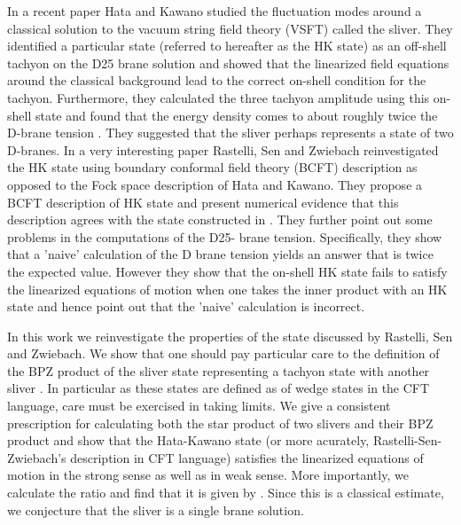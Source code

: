 \documentclass[a4paper,12pt]{article}
\begin{document}
In a recent paper \cite{hk} Hata and Kawano studied the fluctuation modes
around a classical solution to the vacuum string field theory (VSFT) called the
sliver. They identified a particular state (referred to hereafter as the HK
state) as an off-shell tachyon on the D25 brane solution and showed that
the linearized field equations around the classical background lead to the
correct on-shell condition for the tachyon. Furthermore, they calculated
the three tachyon amplitude using this on-shell state and found that the
energy density \coordHE{} comes to about roughly twice the D-brane
tension \coordHE{} \cite{hk}. They suggested that the sliver
perhaps
represents a state of two D-branes. In a very interesting paper \cite{rsz1}
Rastelli, Sen and Zwiebach reinvestigated the HK state using boundary
conformal field theory (BCFT) description as opposed to the Fock space
 description of Hata and Kawano. They propose a BCFT description of HK state
and present numerical evidence that this description agrees with the state
constructed in \cite{hk}. They further point out some problems in
the computations of the D25- brane tension. Specifically, they show that a
'naive' calculation of the D brane tension yields an answer that is twice
the expected value. However they show that the on-shell HK state fails to
satisfy the linearized equations of motion when one takes the inner product
with an HK state and hence point out that the 'naive' calculation is
incorrect.

In this work we reinvestigate the properties of the state discussed by
Rastelli, Sen
and Zwiebach. We show that one should pay particular care to the definition
of the BPZ product of the sliver state \coordHE{} representing
a tachyon state with another sliver \coordHE{}. In particular
as these states are defined as \coordHE{} of wedge states in the CFT
language, care must be  exercised
in taking \coordHE{} limits. We give a
consistent prescription for calculating both the star product of two slivers
and their BPZ product and show that the Hata-Kawano state (or more acurately,
Rastelli-Sen-Zwiebach's description in CFT language) satisfies the
linearized equations of motion in the strong sense as well as in weak sense.
More importantly, we calculate the ratio \coordHE{}
and find that it is given by
\coordHE{}.  Since this is a classical 
estimate, we conjecture that the sliver is a single brane solution.
\end{document}
